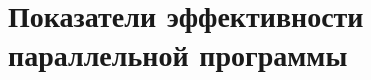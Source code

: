\section{Показатели эффективности параллельной программы}
\label{sec:parallel-efficiency-indicators}







